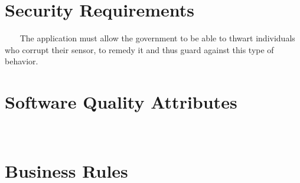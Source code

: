 \documentclass{report}
\begin{document}

\section{Security Requirements} ~~~
The application must allow the government to be able to thwart individuals who
corrupt their sensor, to remedy it and thus guard against this type of behavior.


\section{Software Quality Attributes} ~~~

\section{Business Rules} ~~~

\end{document}
